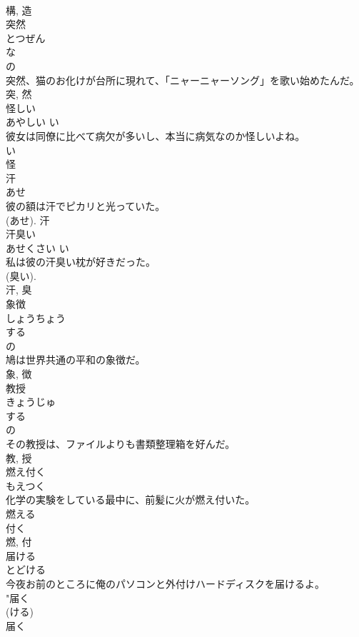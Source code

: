 \documentclass[8pt]{extreport}
\begin{document}
\begin{CJK}{UTF8}{min}
\\	構, 造	
\\	突然	
\\	とつぜん	
\\	な 
\\	の 
\\	突然、猫のお化けが台所に現れて、「ニャーニャーソング」を歌い始めたんだ。	
\\	突, 然	
\\	怪しい	
\\	あやしい	い 
\\	彼女は同僚に比べて病欠が多いし、本当に病気なのか怪しいよね。	
\\	い 
\\	怪	
\\	汗	
\\	あせ	
\\	彼の額は汗でピカリと光っていた。	
\\	(あせ).	汗	
\\	汗臭い	
\\	あせくさい	い 
\\	私は彼の汗臭い枕が好きだった。	
\\	(臭い). 
\\	汗, 臭	
\\	象徴	
\\	しょうちょう	
\\	する 
\\	の 
\\	鳩は世界共通の平和の象徴だ。	
\\	象, 徴	
\\	教授	
\\	きょうじゅ	
\\	する 
\\	の 
\\	その教授は、ファイルよりも書類整理箱を好んだ。	
\\	教, 授	
\\	燃え付く	
\\	もえつく	
\\	化学の実験をしている最中に、前髪に火が燃え付いた。	
\\	燃える 
\\	付く 
\\	燃, 付	
\\	届ける	
\\	とどける	
\\	今夜お前のところに俺のパソコンと外付けハードディスクを届けるよ。	
\\	"届く 
\\	(ける) 
\\	届く 

\end{CJK}
\end{document}
